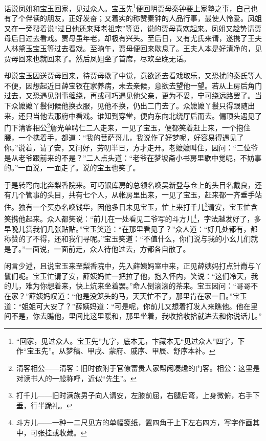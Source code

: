 \par 话说凤姐和宝玉回家，见过众人。宝玉先\footnote{“回家，见过众人。宝玉先”九字，底本无，卞藏本无“见过众人”四字，下作“宝玉先”。从梦稿、甲戌、蒙府、戚序、甲辰、舒序本补。}便回明贾母秦钟要上家塾之事，自己也有了个伴读的朋友，正好发奋；又着实的称赞秦钟的人品行事，最使人怜爱。凤姐又在一旁帮着说“过日他还来拜老祖宗”等语，说的贾母喜欢起来。凤姐又趁势请贾母后日过去看戏。贾母虽年老，却极有兴头。至后日，又有尤氏来请，遂携了王夫人林黛玉宝玉等过去看戏。至晌午，贾母便回来歇息了。王夫人本是好清净的，见贾母回来也就回来了。然后凤姐坐了首席，尽欢至晚无话。
\par 却说宝玉因送贾母回来，待贾母歇了中觉，意欲还去看戏取乐，又恐扰的秦氏等人不便，因想起近日薛宝钗在家养病，未去亲候，意欲去望他一望。若从上房后角门过去，又恐遇见别事缠绕，再或可巧遇见他父亲，更为不妥，宁可绕远路罢了。当下众嬷嬷丫鬟伺候他换衣服，见他不换，仍出二门去了。众嬷嬷丫鬟只得跟随出来，还只当他去那府中看戏。谁知到穿堂，便向东向北绕厅后而去。偏顶头遇见了门下清客相公\footnote{清客相公——清客：旧时依附于官僚富贵人家帮闲凑趣的门客。相公：这里是对读书人的一般称呼，近似“先生”。}詹光单聘仁二人走来，一见了宝玉，便都笑着赶上来，一个抱住腰，一个携着手，都道：“我的菩萨哥儿，我说作了好梦呢，好容易得遇见了你。”说着，请了安，又问好，劳叨半日，方才走开。老嬷嬷叫住，因问：“二位爷是从老爷跟前来的不是？”二人点头道：“老爷在梦坡斋小书房里歇中觉呢，不妨事的。”一面说，一面走了。说的宝玉也笑了。
\par 于是转弯向北奔梨香院来。可巧银库房的总领名唤吴新登与仓上的头目名戴良，还有几个管事的头目，共有七个人，从帐房里出来，一见了宝玉，赶来都一齐垂手站住。独有一个买办名唤钱华，因他多日未见宝玉，忙上来打千儿\footnote{打千儿——旧时满族男子向人请安，左膝前屈，右腿后弯，上身微俯，右手下垂，行半跪礼。}请安，宝玉忙含笑携他起来。众人都笑说：“前儿在一处看见二爷写的斗方儿\footnote{斗方儿——一种一二尺见方的单幅笺纸，置四角于上下左右四方，写字作画其中，可张挂或收藏。}，字法越发好了，多早晚儿赏我们几张贴贴。”宝玉笑道：“在那里看见了？”众人道：“好几处都有，都称赞的了不得，还和我们寻呢。”宝玉笑道：“不值什么，你们说与我的小幺儿们就是了。”一面说，一面前走，众人待他过去，方都各自散了。
\par 闲言少述，且说宝玉来至梨香院中，先入薛姨妈室中来，正见薛姨妈打点针黹与丫鬟们呢。宝玉忙请了安，薛姨妈忙一把拉了他，抱入怀内，笑说：“这们冷天，我的儿，难为你想着来，快上炕来坐着罢。”命人倒滚滚的茶来。宝玉因问：“哥哥不在家？”薛姨妈叹道：“他是没笼头的马，天天忙不了，那里肯在家一日。”宝玉道：“姐姐可大安了？”薛姨妈道：“可是呢，你前儿又想着打发人来瞧他。他在里间不是，你去瞧他，里间比这里暖和，那里坐着，我收拾收拾就进去和你说话儿。”

